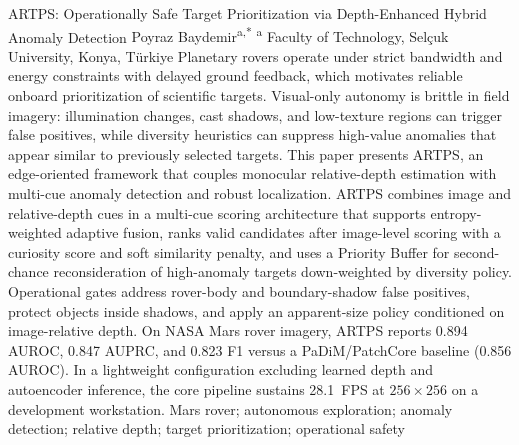 \documentclass[10pt,twocolumn,letterpaper]{article}
\begin{document}
\IACmaketitle
{ARTPS: Operationally Safe Target Prioritization via Depth-Enhanced Hybrid Anomaly Detection}
{Poyraz Baydemir\textsuperscript{a,*}}
{\textsuperscript{a} Faculty of Technology, Sel\c{c}uk University, Konya, T\"urkiye}
{%
Planetary rovers operate under strict bandwidth and energy constraints with delayed ground
feedback, which motivates reliable onboard prioritization of scientific targets. Visual-only
autonomy is brittle in field imagery: illumination changes, cast shadows, and low-texture
regions can trigger false positives, while diversity heuristics can suppress high-value
anomalies that appear similar to previously selected targets.
This paper presents ARTPS, an edge-oriented framework that couples monocular relative-depth
estimation with multi-cue anomaly detection and robust localization.
ARTPS combines image and relative-depth cues in a multi-cue scoring architecture that
supports entropy-weighted adaptive fusion, ranks valid candidates after image-level scoring
with a curiosity score and soft similarity penalty, and uses a Priority Buffer for
second-chance reconsideration of high-anomaly targets down-weighted by diversity policy.
Operational gates address rover-body and boundary-shadow false positives, protect objects
inside shadows, and apply an apparent-size policy conditioned on image-relative depth.
On NASA Mars rover imagery, ARTPS reports 0.894 AUROC, 0.847 AUPRC, and 0.823 F1 versus a
PaDiM/PatchCore baseline (0.856 AUROC).
In a lightweight configuration excluding learned depth and autoencoder inference, the core
pipeline sustains 28.1~FPS at $256{\times}256$ on a development workstation.
}%
{Mars rover; autonomous exploration; anomaly detection; relative depth; target prioritization; operational safety}












\makeatletter
\let\ARTPSoldbibitem\bibitem
\def\bibitem{\@ifnextchar[\ARTPSbibopt\ARTPSbibplain}
\def\ARTPSbibopt[#1]#2{%
  \def\ARTPSthis{#2}%
  \def\ARTPStarget{bell2021mastcamz}%
  \ifx\ARTPSthis\ARTPStarget\newpage\fi
  \ARTPSoldbibitem[#1]{#2}}
\def\ARTPSbibplain#1{\ARTPSoldbibitem{#1}}
\makeatother

\end{document}
